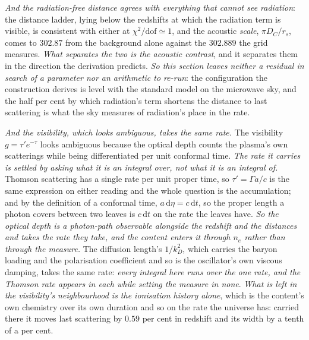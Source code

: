 \documentclass[11pt,a4paper]{article}
\theoremstyle{plain}
\theoremstyle{definition}
\theoremstyle{remark}
\begin{document}
\emph{And the radiation-free distance agrees with everything that cannot see radiation}: the distance ladder,
lying below the redshifts at which the radiation term is visible, is consistent with either at
$\chi^{2}/\text{dof}\simeq1$, and the acoustic \emph{scale}, $\pi D_C/r_s$, comes to $302.87$ from the
background alone against the $302.889$ the grid measures. \emph{What separates the two is the acoustic
\emph{contrast}}, and it separates them in the direction the derivation predicts. \emph{So this section leaves
neither a residual in search of a parameter nor an arithmetic to re-run}: the configuration the construction
derives is level with the standard model on the microwave sky, and the half per cent by which radiation's
term shortens the distance to last scattering is what the sky measures of radiation's place in the rate.

\emph{And the visibility, which looks ambiguous, takes the same rate.} The visibility $g=\tau'e^{-\tau}$
looks ambiguous because the optical depth counts the plasma's own scatterings while being differentiated per
unit conformal time. \emph{The rate it carries is settled by asking what it is an integral \emph{over}, not
what it is an integral \emph{of}.} Thomson scattering has a single rate per unit proper time, so
$\tau'=\Gamma a/c$ is the same expression on either reading and the whole question is the accumulation; and by
the definition of a conformal time, $a\,\mathrm d\eta=c\,\mathrm dt$, so the proper length a photon covers
between two leaves is $c\,\mathrm dt$ on the rate the leaves have. \emph{So the optical depth is a photon-path
observable alongside the redshift and the distances and takes the rate they take, and the content enters it
through $n_e$ rather than through the measure.} The diffusion length's $1/k_D^2$, which carries the baryon
loading and the polarisation coefficient and so is the oscillator's own viscous damping, takes the same rate:
\emph{every integral here runs over the one rate, and the Thomson rate appears in each while setting the
measure in none}.
\emph{What is left in the visibility's neighbourhood is the ionisation history alone}, which is the
content's own chemistry over its own duration and so on the rate the universe has: carried there it moves last scattering
by $0.59$ per cent in redshift and its width by a tenth of a per cent.
\end{document}
